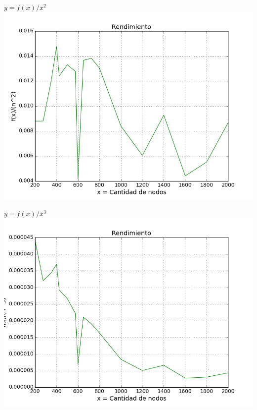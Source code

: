 \begin{center}
	\textbf{$y = f(x)/x^2$}\\
	\includegraphics[scale=0.7]{experimentos/bqlocal/rendimiento_aristas_lineales/complexity_med_over_n_square.png}
\end{center}

\begin{center}
	\textbf{$y = f(x)/x^3$}\\
	\includegraphics[scale=0.7]{experimentos/bqlocal/rendimiento_aristas_lineales/complexity_med_over_n_cube.png}
\end{center}

